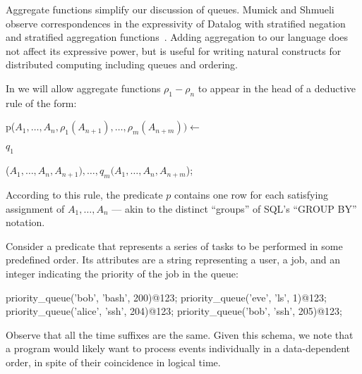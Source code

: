 Aggregate functions simplify our discussion of queues.  Mumick and Shmueli observe correspondences in the expressivity of Datalog with stratified negation and stratified aggregation functions~\cite{mumickshmueli}.  Adding aggregation to our language does not affect its expressive power, but is useful for writing natural constructs for distributed computing including queues and ordering.  

In \slang we will allow
aggregate functions $\rho_1 - \rho_n$ to appear
in the head of a deductive rule of the form:


\begin{dedalus}
p($A_1, \ldots, A_n, \rho_1(A_{n+1}), \ldots, \rho_m(A_{n+m})) \leftarrow$
\end{dedalus}

\hspace{5mm}
$q_1$
\begin{dedalus}
($A_1, \ldots, A_{n}, A_{n+1}), \ldots, q_m(A_1, \ldots, A_{n}, A_{n+m}$);
\end{dedalus}

According to this rule, the predicate $p$ contains one row for each satisfying assignment of $A_1, \ldots, A_n$ --- akin to the distinct ``groups'' of SQL's ``GROUP BY'' notation.



Consider a predicate  that represents a series of tasks to be performed in some predefined order.  Its attributes are a string representing a user, a job, and an integer
indicating the priority of the job in the queue:

\begin{Dedalus}
priority\_queue('bob', 'bash', 200)@123;
priority\_queue('eve', 'ls', 1)@123;
priority\_queue('alice', 'ssh', 204)@123;
priority\_queue('bob', 'ssh', 205)@123;
\end{Dedalus}

Observe that all the time suffixes are the same.  
Given this schema, we note that a program would likely want to process
 events individually in a data-dependent order, in
spite of their coincidence in logical time.  


